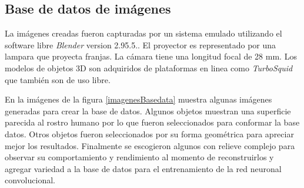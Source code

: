 \documentclass[10pt,letterpaper]{article}
\begin{document}
\subsection{Base de datos de imágenes}
La imágenes creadas fueron capturadas por un sistema emulado utilizando el software libre \textit{Blender} version 2.95.5.. El proyector es representado por una lampara que proyecta franjas. La cámara tiene una longitud focal de 28 mm. Los modelos de objetos 3D son adquiridos de plataformas en linea como \textit{TurboSquid} que también son de uso libre.

En la imágenes de la figura \ref{imagenesBasedata} muestra algunas imágenes generadas para crear la base de datos. Algunos objetos muestran una superficie parecida al rostro humano por lo que fueron seleccionados para conformar la base datos. Otros objetos fueron seleccionados por su forma geométrica para apreciar mejor los resultados. Finalmente se escogieron algunos con relieve complejo para observar su comportamiento y rendimiento al momento de reconstruirlos y agregar variedad a la base de datos para el entrenamiento de la red neuronal convolucional.
\end{document}

